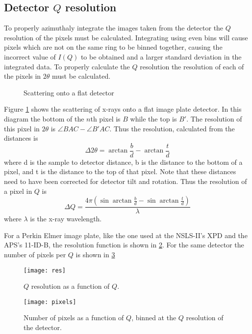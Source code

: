 \subsection{Detector $Q$ resolution} \label{subsec:qres}
To properly azimuthaly integrate the images taken from the detector the $Q$ resolution of the pixels must be calculated.
Integrating using even bins will cause pixels which are not on the same ring to be binned together, causing the incorrect value of $I(Q)$ to be obtained and a larger standard deviation in the integrated data.
To properly calculate the $Q$ resolution the resolution of each of the pixels in $2\theta$ must be calculated.
\begin{figure}
    \centering
    \caption{Scattering onto a flat detector}
    \label{fig:scattering_digram}
\end{figure}
Figure \ref{fig:scattering_digram} shows the scattering of x-rays onto a flat image plate detector.
In this diagram the bottom of the $n$th pixel is $B$ while the top is $B'$.
The resolution of this pixel in $2\theta$ is $\angle BAC - \angle B'AC$.
Thus the resolution, calculated from the distances is
\begin{equation}
\Delta 2 \theta = \arctan{\frac{b}{d}} - \arctan{\frac{t}{d}}
\end{equation}
where d is the sample to detector distance, b is the distance to the bottom of a pixel, and t is the distance to the top of that pixel.
Note that these distances need to have been corrected for detector tilt and rotation.
Thus the resolution of a pixel in $Q$ is
\begin{equation}
\Delta Q = \frac{4\pi(\sin{\arctan{\frac{b}{d}}} - \sin{\arctan{\frac{t}{d}}})}{\lambda}
\end{equation}
where $\lambda$ is the x-ray wavelength.

For a Perkin Elmer image plate, like the one used at the NSLS-II's XPD and the APS's 11-ID-B, the resolution function is shown in \ref{fig:res_func}.
For the same detector the number of pixels per $Q$ is shown in \ref{fig:pixel_hist}
\begin{figure}[!ht]
  \texttt{[image: res]}
\caption{$Q$ resolution as a function of $Q$.}
\label{fig:res_func}
\end{figure}

\begin{figure}[!ht]
  \texttt{[image: pixels]}
\caption{Number of pixels as a function of $Q$, binned at the $Q$ resolution of the detector.}
\label{fig:pixel_hist}
\end{figure}